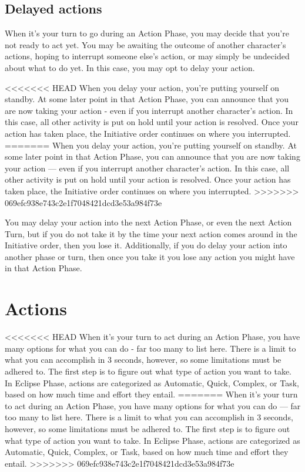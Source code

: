 \subsection{Delayed actions}
\label{sec:delayed-actions}

When it’s your turn to go during an Action Phase, you may decide that you’re not ready to act yet. You may be awaiting the outcome of another character’s actions, hoping to interrupt someone else’s action, or may simply be undecided about what to do yet. In this case, you may opt to delay your action.

<<<<<<< HEAD
When you delay your action, you’re putting yourself on standby. At some later point in that Action Phase, you can announce that you are now taking your action - even if you interrupt another character’s action. In this case, all other activity is put on hold until your action is resolved. Once your action has taken place, the Initiative order continues on where you interrupted.
=======
When you delay your action, you’re putting yourself on standby. At some later point in that Action Phase, you can announce that you are now taking your action --- even if you interrupt another character’s action. In this case, all other activity is put on hold until your action is resolved. Once your action has taken place, the Initiative order continues on where you interrupted.
>>>>>>> 069efc938e743c2e1f7048421dcd3e53a984f73e

You may delay your action into the next Action Phase, or even the next Action Turn, but if you do not take it by the time your next action comes around in the Initiative order, then you lose it. Additionally, if you do delay your action into another phase or turn, then once you take it you lose any action you might have in that Action Phase.


\section{Actions}
\label{sec:actions}

<<<<<<< HEAD
When it’s your turn to act during an Action Phase, you have many options for what you can do - far too many to list here. There is a limit to what you can accomplish in 3 seconds, however, so some limitations must be adhered to. The first step is to figure out what type of action you want to take. In Eclipse Phase, actions are categorized as Automatic, Quick, Complex, or Task, based on how much time and effort they entail.
=======
When it’s your turn to act during an Action Phase, you have many options for what you can do --- far too many to list here. There is a limit to what you can accomplish in 3 seconds, however, so some limitations must be adhered to. The first step is to figure out what type of action you want to take. In Eclipse Phase, actions are categorized as Automatic, Quick, Complex, or Task, based on how much time and effort they entail.
>>>>>>> 069efc938e743c2e1f7048421dcd3e53a984f73e


